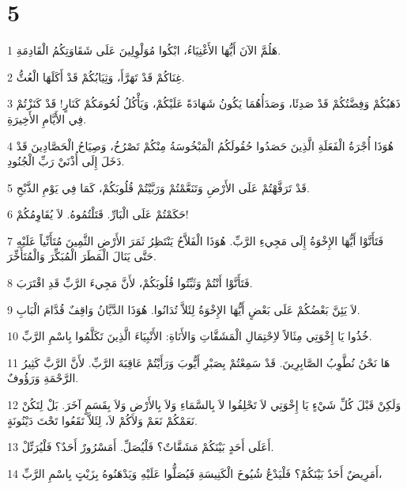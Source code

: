 \chapter{5}

\par 1 هَلُمَّ الآنَ أَيُّهَا الأَغْنِيَاءُ، ابْكُوا مُوَلْوِلِينَ عَلَى شَقَاوَتِكُمُ الْقَادِمَةِ.
\par 2 غِنَاكُمْ قَدْ تَهَرَّأَ، وَثِيَابُكُمْ قَدْ أَكَلَهَا الْعُثُّ.
\par 3 ذَهَبُكُمْ وَفِضَّتُكُمْ قَدْ صَدِئَا، وَصَدَأُهُمَا يَكُونُ شَهَادَةً عَلَيْكُمْ، وَيَأْكُلُ لُحُومَكُمْ كَنَارٍ! قَدْ كَنَزْتُمْ فِي الأَيَّامِ الأَخِيرَةِ.
\par 4 هُوَذَا أُجْرَةُ الْفَعَلَةِ الَّذِينَ حَصَدُوا حُقُولَكُمُ الْمَبْخُوسَةُ مِنْكُمْ تَصْرُخُ، وَصِيَاحُ الْحَصَّادِينَ قَدْ دَخَلَ إِلَى أُذْنَيْ رَبِّ الْجُنُودِ.
\par 5 قَدْ تَرَفَّهْتُمْ عَلَى الأَرْضِ وَتَنَعَّمْتُمْ وَرَبَّيْتُمْ قُلُوبَكُمْ، كَمَا فِي يَوْمِ الذَّبْحِ.
\par 6 حَكَمْتُمْ عَلَى الْبَارِّ. قَتَلْتُمُوهُ. لاَ يُقَاوِمُكُمْ!
\par 7 فَتَأَنَّوْا أَيُّهَا الإِخْوَةُ إِلَى مَجِيءِ الرَّبِّ. هُوَذَا الْفَلاَّحُ يَنْتَظِرُ ثَمَرَ الأَرْضِ الثَّمِينَ مُتَأَنِّياً عَلَيْهِ حَتَّى يَنَالَ الْمَطَرَ الْمُبَكِّرَ وَالْمُتَأَخِّرَ.
\par 8 فَتَأَنَّوْا أَنْتُمْ وَثَبِّتُوا قُلُوبَكُمْ، لأَنَّ مَجِيءَ الرَّبِّ قَدِ اقْتَرَبَ.
\par 9 لاَ يَئِنَّ بَعْضُكُمْ عَلَى بَعْضٍ أَيُّهَا الإِخْوَةُ لِئَلاَّ تُدَانُوا. هُوَذَا الدَّيَّانُ وَاقِفٌ قُدَّامَ الْبَابِ.
\par 10 خُذُوا يَا إِخْوَتِي مِثَالاً لاِحْتِمَالِ الْمَشَقَّاتِ وَالأَنَاةِ: الأَنْبِيَاءَ الَّذِينَ تَكَلَّمُوا بِاسْمِ الرَّبِّ.
\par 11 هَا نَحْنُ نُطَّوِبُ الصَّابِرِينَ. قَدْ سَمِعْتُمْ بِصَبْرِ أَيُّوبَ وَرَأَيْتُمْ عَاقِبَةَ الرَّبِّ. لأَنَّ الرَّبَّ كَثِيرُ الرَّحْمَةِ وَرَؤُوفٌ.
\par 12 وَلَكِنْ قَبْلَ كُلِّ شَيْءٍ يَا إِخْوَتِي لاَ تَحْلِفُوا لاَ بِالسَّمَاءِ وَلاَ بِالأَرْضِ وَلاَ بِقَسَمٍ آخَرَ. بَلْ لِتَكُنْ نَعَمْكُمْ نَعَمْ وَلاَكُمْ لاَ، لِئَلاَّ تَقَعُوا تَحْتَ دَيْنُونَةٍ.
\par 13 أَعَلَى أَحَدٍ بَيْنَكُمْ مَشَقَّاتٌ؟ فَلْيُصَلِّ. أَمَسْرُورٌ أَحَدٌ؟ فَلْيُرَتِّلْ.
\par 14 أَمَرِيضٌ أَحَدٌ بَيْنَكُمْ؟ فَلْيَدْعُ شُيُوخَ الْكَنِيسَةِ فَيُصَلُّوا عَلَيْهِ وَيَدْهَنُوهُ بِزَيْتٍ بِاسْمِ الرَّبِّ،
